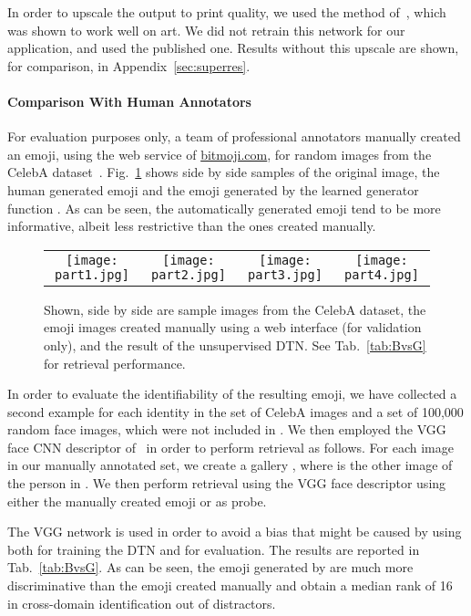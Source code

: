 \documentclass{article} \usepackage{iclr2017_conference,times}
\begin{document}
In order to upscale the  output to print quality, we used the method of~\cite{superres}, which was shown to work well on art. We did not retrain this network for our application, and used the published one. Results without this upscale are shown, for comparison, in Appendix~\ref{sec:superres}. 

\paragraph{Comparison With Human Annotators}For evaluation purposes only, a team of professional annotators manually created an emoji, using the web service of \url{bitmoji.com}, for  random images from the CelebA dataset~\citep{celeba}.  Fig.~\ref{fig:IBtagB} shows side by side samples of the original image, the human generated emoji and the emoji generated by the learned generator function .  As can be seen, the automatically generated emoji tend to be more informative, albeit less restrictive than the ones created manually. 

\begin{figure}[t]
\centering
\begin{tabular}{cccc}
\texttt{[image: part1.jpg]}&
\texttt{[image: part2.jpg]}&
\texttt{[image: part3.jpg]}&
\texttt{[image: part4.jpg]}
\end{tabular}
\caption{\label{fig:IBtagB} Shown, side by side are sample images from the CelebA dataset, the emoji images created manually using a web interface (for validation only), and the result of the unsupervised DTN. See Tab.~\ref{tab:BvsG} for retrieval performance.}
\end{figure}

In order to evaluate the identifiability of the resulting emoji, we have collected a second example for each identity in the set of  CelebA images and a set  of 100,000 random face images, which were not included in . We then employed the VGG face CNN descriptor of~\cite{Parkhi15} in order to perform retrieval as follows. For each image  in our manually annotated set, we create a gallery  , where  is the other image of the person in . We then perform retrieval using the VGG face descriptor using either the manually created emoji or  as probe. 

The VGG network is used in order to avoid a bias that might be caused by using  both for training the DTN and for evaluation. The results are reported in Tab.~\ref{tab:BvsG}. As can be seen, the emoji generated by  are much more discriminative than the emoji created manually and obtain a median rank of 16 in cross-domain identification out of  distractors.
\end{document}
